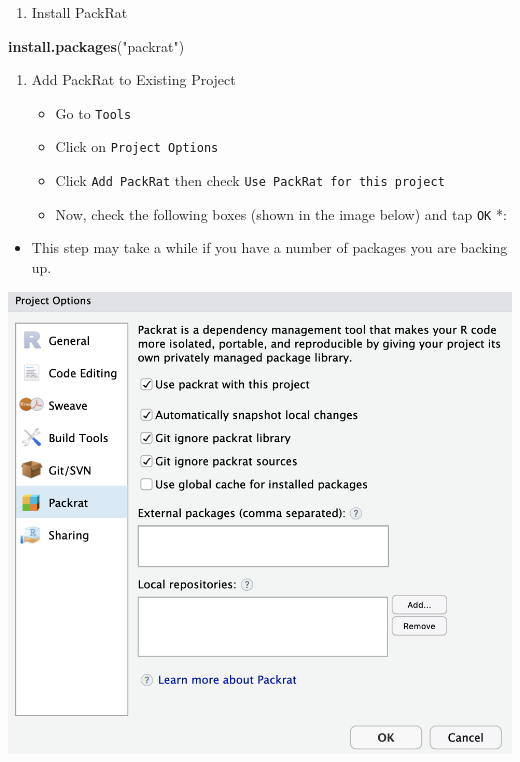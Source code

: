 \documentclass[openany]{article}
\newenvironment{Shaded}{\begin{snugshade}}{\end{snugshade}}
\newcommand{\KeywordTok}[1]{\textcolor[rgb]{0.13,0.29,0.53}{\textbf{#1}}}
\newcommand{\NormalTok}[1]{#1}
\newcommand{\StringTok}[1]{\textcolor[rgb]{0.31,0.60,0.02}{#1}}
\providecommand{\tightlist}{%
  \setlength{\itemsep}{0pt}\setlength{\parskip}{0pt}}
\begin{document}
\begin{enumerate}
\def\labelenumi{\arabic{enumi}.}
\tightlist
\item
  Install PackRat
\end{enumerate}

\begin{Shaded}
\begin{Highlighting}[]
\KeywordTok{install.packages}\NormalTok{(}\StringTok{"packrat"}\NormalTok{)}
\end{Highlighting}
\end{Shaded}

\begin{enumerate}
\def\labelenumi{\arabic{enumi}.}
\setcounter{enumi}{1}
\item
  Add PackRat to Existing Project

  \begin{itemize}
  \tightlist
  \item
    Go to \texttt{Tools}
  \item
    Click on \texttt{Project\ Options}
  \item
    Click \texttt{Add\ PackRat} then check \texttt{Use\ PackRat\ for\ this\ project}
  \item
    Now, check the following boxes (shown in the image below) and tap \texttt{OK} *:
  \end{itemize}
\end{enumerate}

\begin{itemize}
\tightlist
\item
  This step may take a while if you have a number of packages you are backing up.
\end{itemize}

\begin{center}\includegraphics[width=0.6\linewidth]{images/Workflow_Photos/packRat} \end{center}
\end{document}
